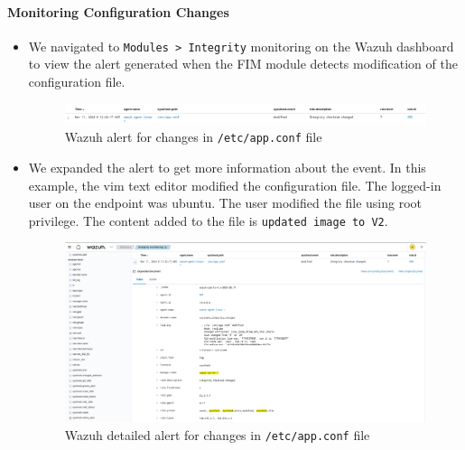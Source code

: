 \paragraph{Monitoring Configuration Changes}
\begin{itemize}
    \item We navigated to \texttt{Modules > Integrity} monitoring on the Wazuh dashboard to view the alert generated when the FIM module detects modification of the configuration file.
          \begin{figure} [H]
              \centering
              \includegraphics[width=\textwidth]{images/fim/fim-6.png}
              \caption{Wazuh alert for changes in \texttt{/etc/app.conf} file}
              \label{fig:fim-6}
          \end{figure}

    \item We expanded the alert to get more information about the event. In this example, the vim text editor modified the configuration file. The logged-in user on the endpoint was ubuntu. The user modified the file using root privilege. The content added to the file is \texttt{updated image to V2}.
          \begin{figure} [H]
              \centering
              \includegraphics[width=\textwidth]{images/fim/fim-8.png}
              \caption{Wazuh detailed alert for changes in \texttt{/etc/app.conf} file}
              \label{fig:fim-8}
          \end{figure}

\end{itemize}
